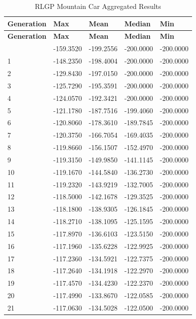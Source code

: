 \begin{longtable}{|l|l|l|l|l|}
\caption{RLGP Mountain Car Aggregated Results}\label{tab:mountain-car-q}\\\hline
\textbf{Generation} & \textbf{Max} & \textbf{Mean} & \textbf{Median} & \textbf{Min} \\\hline
\endfirsthead
\hline
\textbf{Generation} & \textbf{Max} & \textbf{Mean} & \textbf{Median} & \textbf{Min} \\\hline
\endhead
\hline
\endfoot
0 & -159.3520 & -199.2556 & -200.0000 & -200.0000 \\\hline
1 & -148.2350 & -198.4004 & -200.0000 & -200.0000 \\\hline
2 & -129.8430 & -197.0150 & -200.0000 & -200.0000 \\\hline
3 & -125.7290 & -195.3591 & -200.0000 & -200.0000 \\\hline
4 & -124.0570 & -192.3421 & -200.0000 & -200.0000 \\\hline
5 & -121.1780 & -187.7516 & -199.4060 & -200.0000 \\\hline
6 & -120.8060 & -178.3610 & -189.7845 & -200.0000 \\\hline
7 & -120.3750 & -166.7054 & -169.4035 & -200.0000 \\\hline
8 & -119.8660 & -156.1507 & -152.4970 & -200.0000 \\\hline
9 & -119.3150 & -149.9850 & -141.1145 & -200.0000 \\\hline
10 & -119.1670 & -144.5840 & -136.2730 & -200.0000 \\\hline
11 & -119.2320 & -143.9219 & -132.7005 & -200.0000 \\\hline
12 & -118.5000 & -142.1678 & -129.3525 & -200.0000 \\\hline
13 & -118.1800 & -138.9305 & -126.1845 & -200.0000 \\\hline
14 & -118.2710 & -138.1095 & -125.1595 & -200.0000 \\\hline
15 & -117.8970 & -136.6103 & -123.5150 & -200.0000 \\\hline
16 & -117.1960 & -135.6228 & -122.9925 & -200.0000 \\\hline
17 & -117.2360 & -134.5921 & -122.7375 & -200.0000 \\\hline
18 & -117.2640 & -134.1918 & -122.2970 & -200.0000 \\\hline
19 & -117.4570 & -134.4230 & -122.2370 & -200.0000 \\\hline
20 & -117.4990 & -133.8670 & -122.0585 & -200.0000 \\\hline
21 & -117.0630 & -134.5028 & -122.0500 & -200.0000 \\\hline

\end{longtable}
